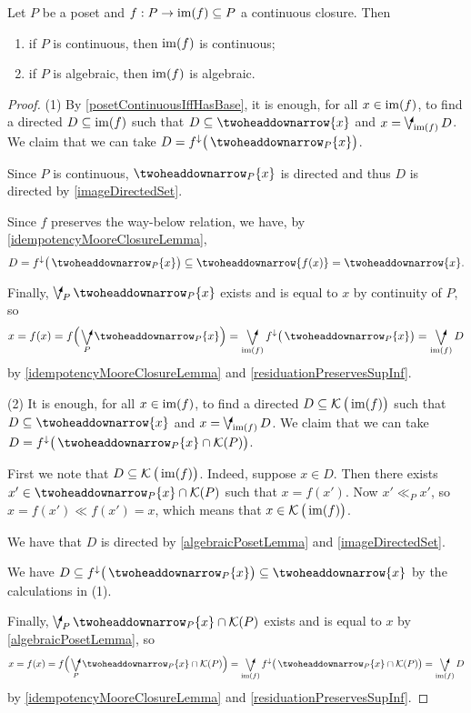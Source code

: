 \begin{proposition}
Let $P$ be a poset and $f: P\to \operatorname{im}(f) \subseteq P$ a continuous closure. Then
\begin{enumerate}
\item if $P$ is continuous, then $\operatorname{im}(f)$ is continuous;
\item if $P$ is algebraic, then $\operatorname{im}(f)$ is algebraic.
\end{enumerate}
\end{proposition}
\begin{proof}
(1) By \ref{posetContinuousIffHasBase}, it is enough, for all $x\in \operatorname{im}(f)$, to find a directed $D\subseteq \operatorname{im}(f)$ such that $D\subseteq \ddownset\{x\}$ and $x= \dirvee_{\im(f)} D$. We claim that we can take $D = f^\imf\big(\ddownset_P\{x\}\big)$.

Since $P$ is continuous, $\ddownset_P\{x\}$ is directed and thus $D$ is directed by \ref{imageDirectedSet}.

Since $f$ preserves the way-below relation, we have, by \ref{idempotencyMooreClosureLemma},
\[ D = f^\imf\big(\ddownset_P\{x\}\big) \subseteq \ddownset\{f(x)\} = \ddownset\{x\}. \]

Finally, $\dirvee_P \ddownset_P\{x\}$ exists and is equal to $x$ by continuity of $P$, so
\[ x = f(x) = f\Big(\dirvee_P \ddownset_P\{x\}\Big) = \dirvee_{\im(f)}f^\imf\big(\ddownset_P\{x\}\big) = \dirvee_{\im(f)}D \]
by \ref{idempotencyMooreClosureLemma} and \ref{residuationPreservesSupInf}.

(2) It is enough, for all $x\in \operatorname{im}(f)$, to find a directed $D\subseteq \operatorname{\mathcal{K}}\big(\operatorname{im}(f)\big)$ such that $D\subseteq \ddownset\{x\}$ and $x= \dirvee_{\im(f)} D$. We claim that we can take $D = f^\imf\big(\ddownset_P\{x\} \cap \compacts(P)\big)$.

First we note that $D\subseteq \operatorname{\mathcal{K}}\big(\operatorname{im}(f)\big)$. Indeed, suppose $x\in D$. Then there exists $x'\in \ddownset_P\{x\} \cap \compacts(P)$ such that $x = f(x')$. Now $x'\ll_P x'$, so $x = f(x') \ll f(x') = x$, which means that $x\in \operatorname{\mathcal{K}}\big(\operatorname{im}(f)\big)$.

We have that $D$ is directed by \ref{algebraicPosetLemma} and \ref{imageDirectedSet}.

We have $D \subseteq  f^\imf\big(\ddownset_P\{x\}\big) \subseteq \ddownset\{x\}$ by the calculations in (1).

Finally, $\dirvee_P \ddownset_P\{x\} \cap \compacts(P)$ exists and is equal to $x$ by \ref{algebraicPosetLemma}, so
\[ x = f(x) = f\Big(\dirvee_P \ddownset_P\{x\}\cap \compacts(P)\Big) = \dirvee_{\im(f)}f^\imf\big(\ddownset_P\{x\}\cap \compacts(P)\big) = \dirvee_{\im(f)}D \]
by \ref{idempotencyMooreClosureLemma} and \ref{residuationPreservesSupInf}.
\end{proof}

